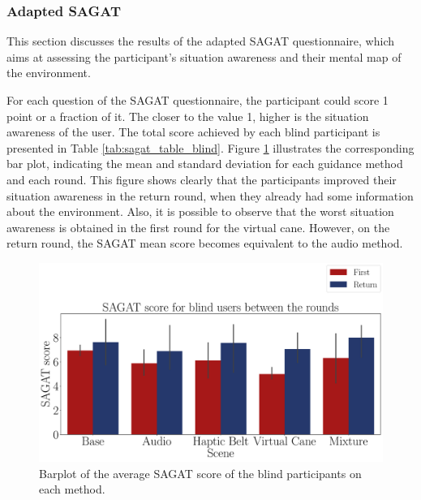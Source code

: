 \subsubsection{Adapted SAGAT}
\label{subsubsec:results_adapted_sagat_1}

This section discusses the results of the adapted SAGAT questionnaire, which aims at assessing the participant's situation awareness and their mental map of the environment. 

For each question of the SAGAT questionnaire, the participant could score 1 point or a fraction of it. The closer to the value 1, higher is the situation awareness of the user. The total score achieved by each blind participant is presented in Table \ref{tab:sagat_table_blind}. Figure  \ref{fig:barplot_sagat_avg_5_scene_blind} illustrates the corresponding bar plot, indicating the mean and standard deviation for each guidance method and each round. This figure shows clearly that the participants improved their situation awareness in the return round, when they already had some information about the environment. Also, it is possible to observe that the worst situation awareness is obtained in the first round for the virtual cane. However, on the return round, the SAGAT mean score becomes equivalent to the audio method.



\begin{figure}[!htb]
    \centering
    \includegraphics[width = \textwidth]{Resultados/Sagat/Figuras/pdf/barplot_sagat_avg_5_scene_blind.pdf}
    \caption{Barplot of the average SAGAT score of the blind participants on each method.}
    \label{fig:barplot_sagat_avg_5_scene_blind}
\end{figure}

